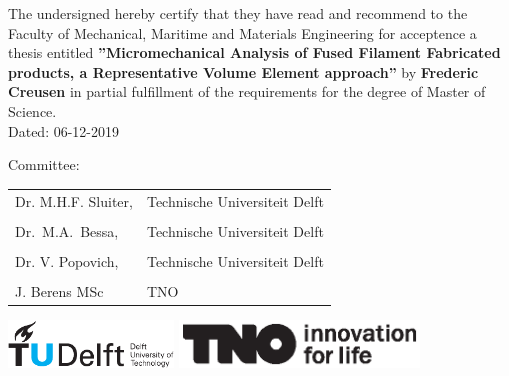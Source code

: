 \begin{titlepage}
\begin{center}
\end{center}

\clearpage
\thispagestyle{empty}

\noindent The undersigned hereby certify that they have read and recommend to the Faculty of Mechanical, Maritime and Materials Engineering for acceptence a thesis entitled \textbf{”Micromechanical Analysis of Fused Filament Fabricated products, a Representative Volume Element approach”} by \textbf{Frederic Creusen} in partial fulfillment of the requirements for the degree of Master of Science.\\
Dated: 06-12-2019

\bigskip
\noindent  Committee:

\medskip\noindent
\begin{tabular}{b{4cm}m{6cm}}
Dr. M.H.F. Sluiter, & Technische Universiteit Delft \\
\\
Dr.\ M.A.\ Bessa, & Technische Universiteit Delft \\
\\
Dr. V. Popovich, & Technische Universiteit Delft \\
\\
J. Berens MSc & TNO \\
\end{tabular}

\vfill
\begin{center}
    \includegraphics[height=0.5in]{title/logos/tudelft}
    \hspace{2em}
    \includegraphics[height=0.5in]{title/logos/tno.eps} \\
\end{center}
\vfill



\end{titlepage}
